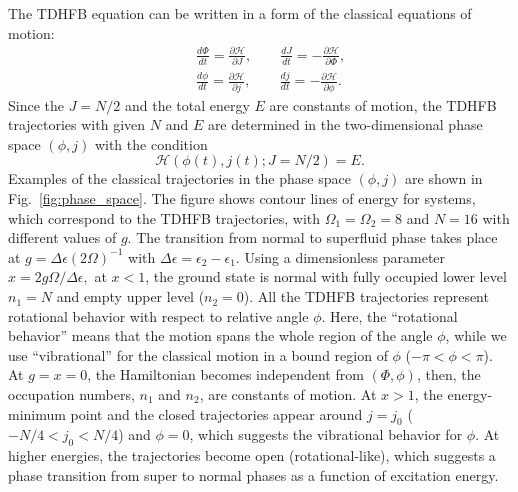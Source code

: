 \documentclass[%
superscriptaddress,
preprint,
showpacs,
nofootinbib,
amsmath,amssymb,
aps,
prc,
floatfix ]%
{revtex4-1}
\begin{document}
The TDHFB equation can be written in a form of
the classical equations of motion:
\begin{eqnarray}
	&&\frac{d\Phi}{dt} = \frac{\partial\mathcal{H}}{\partial J} ,\quad\quad
\frac{dJ}{dt} = -\frac{\partial\mathcal{H}}{\partial \Phi} , \\
	&&\frac{d\phi}{dt} = \frac{\partial\mathcal{H}}{\partial j} ,\quad\quad
\frac{dj}{dt} = -\frac{\partial\mathcal{H}}{\partial \phi} .
\label{TDHFB_equation}
\end{eqnarray}
Since the $J=N/2$ and the total energy $E$ are constants of motion,
the TDHFB trajectories with given $N$ and $E$ are determined
in the two-dimensional phase space $(\phi,j)$ with the condition
\begin{equation}
  \mathcal{H}(\phi(t),j(t);J=N/2) = E.
\end{equation}
Examples of the classical trajectories in the phase space
$(\phi,j)$ are shown in Fig.~\ref{fig:phase_space}.
The figure shows contour lines of energy for systems,
which correspond to the TDHFB trajectories,
with $\Omega_1=\Omega_2=8$ and $N=16$ with different values of $g$.
The transition from normal to superfluid phase takes place at
$g=\Delta\epsilon(2\Omega)^{-1}$ with $\Delta\epsilon=\epsilon_2-\epsilon_1$.
Using a dimensionless parameter
$
  x = 2g\Omega/\Delta\epsilon,
$
at $x<1$, the ground state is normal with fully occupied
lower level $n_1=N$ and empty upper level ($n_2=0$).
All the TDHFB trajectories represent rotational behavior with respect to
relative angle $\phi$.
Here, the ``rotational behavior'' means that the motion spans the whole
region of the angle $\phi$,
while we use ``vibrational'' for the classical motion in a bound region of
$\phi$ ($-\pi<\phi<\pi$).
At $g=x=0$, the Hamiltonian becomes independent from $(\Phi,\phi)$, then,
the occupation numbers, $n_1$ and $n_2$, are constants of motion.
At $x>1$, the energy-minimum point and the closed trajectories appear around
$j=j_0$ ($-N/4 < j_0 < N/4$) and $\phi=0$,
which suggests the vibrational behavior for $\phi$.
At higher energies, the trajectories become open (rotational-like),
which suggests a phase transition from super to normal phases
as a function of excitation energy.
\end{document}

